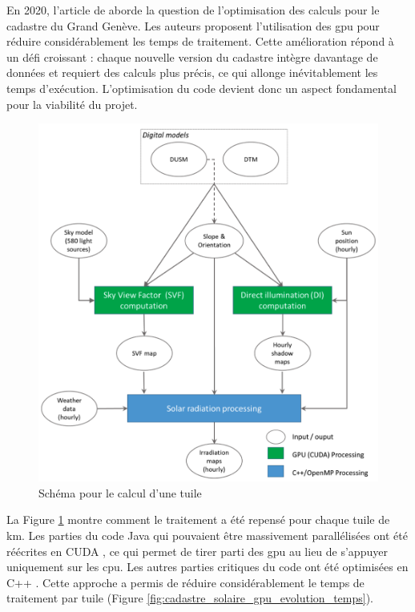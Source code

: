 \par{En 2020, l'article \cite{stendardo_gpu-enabled_2020} de \citeauthor{stendardo_gpu-enabled_2020} aborde la question de l'optimisation des calculs pour le cadastre du Grand Genève. Les auteurs proposent l'utilisation des \acrshort{gpu} pour réduire considérablement les temps de traitement. Cette amélioration répond à un défi croissant : chaque nouvelle version du cadastre intègre davantage de données et requiert des calculs plus précis, ce qui allonge inévitablement les temps d'exécution. L'optimisation du code devient donc un aspect fondamental pour la viabilité du projet.}

\begin{figure}[H]
    \centering
    \includegraphics[width=1\linewidth]{02-main//figures/ch2/cadastre_solaire_gpu.png}
    \caption{Schéma pour le calcul d'une tuile \cite{stendardo_gpu-enabled_2020}}
    \label{fig:cadastre_solaire_gpu}
\end{figure}

La Figure \ref{fig:cadastre_solaire_gpu} montre comment le traitement a été repensé pour chaque tuile de \si{} \si{\unit{km}}. Les parties du code Java qui pouvaient être massivement parallélisées ont été réécrites en CUDA \cite{nvidia_cuda_nodate}, ce qui permet de tirer parti des \acrshort{gpu} au lieu de s'appuyer uniquement sur les \acrshort{cpu}. Les autres parties critiques du code ont été optimisées en C++ \cite{noauthor_c_2025}. Cette approche a permis de réduire considérablement le temps de traitement par tuile (Figure \ref{fig:cadastre_solaire_gpu_evolution_temps}).


